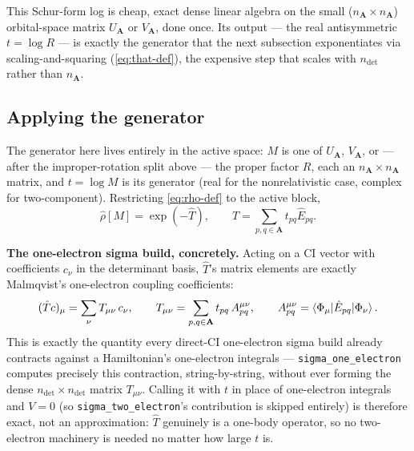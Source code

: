 \documentclass[aip,jcp,preprint]{revtex4-1}
\begin{document}
This Schur-form log is cheap, exact dense linear algebra on the small
($n_{\mathbf{A}}\times n_{\mathbf{A}}$) orbital-space matrix $U_{\mathbf{A}}$ or
$V_{\mathbf{A}}$, done once. Its output --- the real antisymmetric
$t=\log R$ --- is exactly the generator that the next subsection exponentiates
via scaling-and-squaring (\cref{eq:that-def}), the expensive step that scales
with $n_{\det}$ rather than $n_{\mathbf{A}}$.

\subsection{Applying the generator}

The generator here lives entirely in the active space: $M$ is one of
$U_{\mathbf{A}}$, $V_{\mathbf{A}}$, or --- after the improper-rotation split above
--- the proper factor $R$, each an $n_{\mathbf{A}}\times n_{\mathbf{A}}$ matrix, and
$t=\log M$ is its generator (real for the nonrelativistic case, complex for
two-component). Restricting \cref{eq:rho-def} to the active block,
\begin{equation}
 \hat{\rho}[M] = \exp(-\hat{T}), \qquad
 \hat{T} = \sum_{p,q\in\mathbf{A}} t_{pq}\hat{E}_{pq}.
 \label{eq:that-def}
\end{equation}

\textbf{The one-electron sigma build, concretely.} Acting on a CI vector with
coefficients $c_\nu$ in the determinant basis, $\hat{T}$'s matrix elements are
exactly Malmqvist's one-electron coupling coefficients:
\begin{equation}
 (\hat{T}c)_\mu = \sum_\nu T_{\mu\nu}\,c_\nu,
 \qquad T_{\mu\nu} = \sum_{p,q\in\mathbf{A}} t_{pq}\,A^{\mu\nu}_{pq},
 \qquad A^{\mu\nu}_{pq} = \braket{\Phi_\mu|\hat{E}_{pq}|\Phi_\nu}.
\end{equation}
This is exactly the quantity every direct-CI one-electron sigma build already
contracts against a Hamiltonian's one-electron integrals ---
\texttt{sigma\_one\_electron} computes precisely this contraction,
string-by-string, without ever forming the dense $n_{\det}\times n_{\det}$
matrix $T_{\mu\nu}$. Calling it with $t$ in place of one-electron integrals
and $V=0$ (so \texttt{sigma\_two\_electron}'s contribution is skipped
entirely) is therefore exact, not an approximation: $\hat{T}$ genuinely is a
one-body operator, so no two-electron machinery is needed no matter how large
$t$ is.
\end{document}
